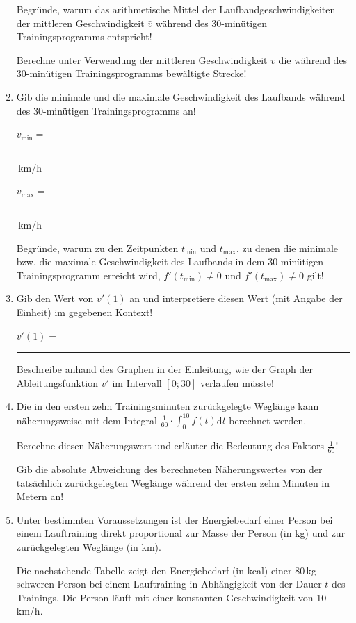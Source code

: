 \begin{langesbeispiel}
\begin{enumerate}
	Begründe, warum das arithmetische Mittel der Laufbandgeschwindigkeiten der mittleren Geschwindigkeit $\bar{v}$ während des 30-minütigen Trainingsprogramms entspricht!
	
	Berechne unter Verwendung der mittleren Geschwindigkeit $\bar{v}$ die während des 30-minütigen Trainingsprogramms bewältigte Strecke!
	
	\item Gib die minimale und die maximale Geschwindigkeit des Laufbands während des 30-minütigen Trainingsprogramms an!\leer
	
	$v_\text{min}=$ \rule{5cm}{0.3pt}\,km/h\leer
	
	$v_\text{max}=$ \rule{5cm}{0.3pt}\,km/h\leer
	
	Begründe, warum zu den Zeitpunkten $t_{\text{min}}$ und $t_{\text{max}}$, zu denen die minimale bzw. die maximale Geschwindigkeit des Laufbands in dem 30-minütigen Trainingsprogramm erreicht wird, $f'(t_{\text{min}})\neq 0$ und $f'(t_\text{max})\neq 0$ gilt!\leer
	
	\item Gib den Wert von $v'(1)$ an und interpretiere diesen Wert (mit Angabe der Einheit) im gegebenen Kontext!\leer
	
	$v'(1)=$ \rule{5cm}{0.3pt}\leer
	
	Beschreibe anhand des Graphen in der Einleitung, wie der Graph der Ableitungsfunktion $v'$ im Intervall $[0;30]$ verlaufen müsste!\leer
	
	\item Die in den ersten zehn Trainingsminuten zurückgelegte Weglänge kann näherungsweise mit dem Integral $\frac{1}{60}\cdot\int^{10}_0{f(t)}$d$t$ berechnet werden.
	
	Berechne diesen Näherungswert und erläuter die Bedeutung des Faktors $\frac{1}{60}$!\leer
	
	Gib die absolute Abweichung des berechneten Näherungswertes von der tatsächlich zurückgelegten Weglänge während der ersten zehn Minuten in Metern an!	\leer
	
	\item Unter bestimmten Voraussetzungen ist der Energiebedarf einer Person bei einem Lauftraining direkt proportional zur Masse der Person (in kg) und zur zurückgelegten Weglänge (in km).

Die nachstehende Tabelle zeigt den Energiebedarf (in kcal) einer 80\,kg schweren Person bei einem Lauftraining in Abhängigkeit von der Dauer $t$ des Trainings. Die Person läuft mit einer konstanten Geschwindigkeit von 10\,km/h.


\end{enumerate}
\end{langesbeispiel}
